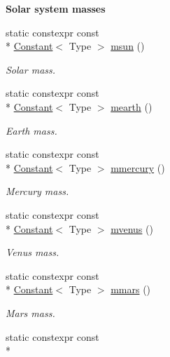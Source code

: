 \begin{Indent}{\bf Solar system masses}\par
\begin{DoxyCompactItemize}
\item 
static constexpr const \\*
\hyperlink{exceptionmagrathea_1_1Constant}{Constant}$<$ Type $>$ \hyperlink{exceptionmagrathea_1_1Constants_a05aeb4cb3e90dc16b1a96f4953f52443}{msun} ()
\begin{DoxyCompactList}\small\item\em Solar mass. \end{DoxyCompactList}\item 
static constexpr const \\*
\hyperlink{exceptionmagrathea_1_1Constant}{Constant}$<$ Type $>$ \hyperlink{exceptionmagrathea_1_1Constants_a2835297027d76138d6cc1ac7edf679ad}{mearth} ()
\begin{DoxyCompactList}\small\item\em Earth mass. \end{DoxyCompactList}\item 
static constexpr const \\*
\hyperlink{exceptionmagrathea_1_1Constant}{Constant}$<$ Type $>$ \hyperlink{exceptionmagrathea_1_1Constants_a9859efe39ad83e72738ddfc8848c7165}{mmercury} ()
\begin{DoxyCompactList}\small\item\em Mercury mass. \end{DoxyCompactList}\item 
static constexpr const \\*
\hyperlink{exceptionmagrathea_1_1Constant}{Constant}$<$ Type $>$ \hyperlink{exceptionmagrathea_1_1Constants_a33c55864fdf7231905e5060bcc51108d}{mvenus} ()
\begin{DoxyCompactList}\small\item\em Venus mass. \end{DoxyCompactList}\item 
static constexpr const \\*
\hyperlink{exceptionmagrathea_1_1Constant}{Constant}$<$ Type $>$ \hyperlink{exceptionmagrathea_1_1Constants_ae1ce6554227d7234658c067c66d05058}{mmars} ()
\begin{DoxyCompactList}\small\item\em Mars mass. \end{DoxyCompactList}\item 
static constexpr const \\*

\end{DoxyCompactItemize}
\end{Indent}
